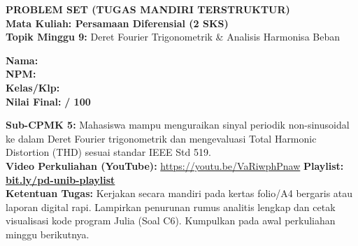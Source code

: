 \documentclass[10pt,a4paper]{article}
\begin{document}
\noindent\begin{minipage}[c]{0.68\textwidth}%
  {\large\textbf{\color{unibblue}PROBLEM SET (TUGAS MANDIRI TERSTRUKTUR)}}\\[1mm]
  {\normalsize\textbf{Mata Kuliah: Persamaan Diferensial (2 SKS)}}\\[0.5mm]
  {\small\textbf{Topik Minggu 9:} Deret Fourier Trigonometrik \& Analisis Harmonisa Beban}%
\end{minipage}%
\hfill%
\begin{minipage}[c]{0.30\textwidth}%
  \begin{tcolorbox}[colback=unibblue!5,colframe=unibblue,boxrule=0.6pt,arc=2pt,left=4pt,right=4pt,top=2pt,bottom=2pt]
    \scriptsize
    \textbf{Nama:} \dotfill\\[1.2mm]
    \textbf{NPM:} \dotfill\\[1.2mm]
    \textbf{Kelas/Klp:} \dotfill\\[1.2mm]
    \textbf{Nilai Final:} \hfill \textbf{/ 100}
  \end{tcolorbox}%
\end{minipage}\par

\vspace{1.5mm}

\begin{tcolorbox}[colback=boxbg,colframe=unibgold!90!black,boxrule=0.6pt,arc=2pt,left=5pt,right=5pt,top=3pt,bottom=3pt,title=\textbf{\scriptsize Capaian Pembelajaran (Sub-CPMK 5) \& Pedoman Pengerjaan Tugas}]
  \scriptsize
  \textbf{Sub-CPMK 5:} Mahasiswa mampu menguraikan sinyal periodik non-sinusoidal ke dalam Deret Fourier trigonometrik dan mengevaluasi Total Harmonic Distortion (THD) sesuai standar IEEE Std 519.\\
  \textbf{Video Perkuliahan (YouTube):} \url{https://youtu.be/VaRiwphPnaw} \hfill \textbf{Playlist:} \href{https://www.youtube.com/playlist?list=PLS5oOZWXZeTw}{\color{unibblue}\textbf{bit.ly/pd-unib-playlist}}\\\textbf{Ketentuan Tugas:} Kerjakan secara mandiri pada kertas folio/A4 bergaris atau laporan digital rapi. Lampirkan penurunan rumus analitis lengkap dan cetak visualisasi kode program Julia (Soal C6). Kumpulkan pada awal perkuliahan minggu berikutnya.
\end{tcolorbox}

\vspace{1.5mm}
\end{document}
